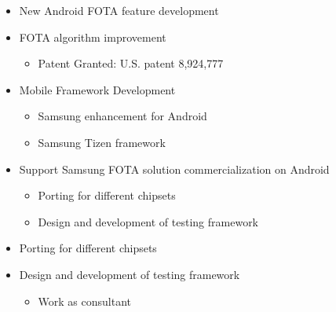 \documentclass[11pt,a4paper,sans]{moderncv}        %
\begin{document}
%
\begin{itemize}%
\item New Android FOTA feature development
\item FOTA algorithm improvement
  \begin{itemize}%
  \item Patent Granted: U.S. patent 8,924,777 
  \end{itemize}
\item Mobile Framework Development
  \begin{itemize}%
  \item Samsung enhancement for Android
  \item Samsung Tizen framework
  \end{itemize}
\item Support Samsung FOTA solution commercialization on Android
  \begin{itemize}%
  \item Porting for different chipsets
  \item Design and development of testing framework\\
  \end{itemize}
\end{itemize}
%
\begin{itemize}%
\item Porting for different chipsets
\item Design and development of testing framework\\
  \begin{itemize}%
  \item Work as consultant
  \end{itemize}
\end{itemize}
\end{document}
